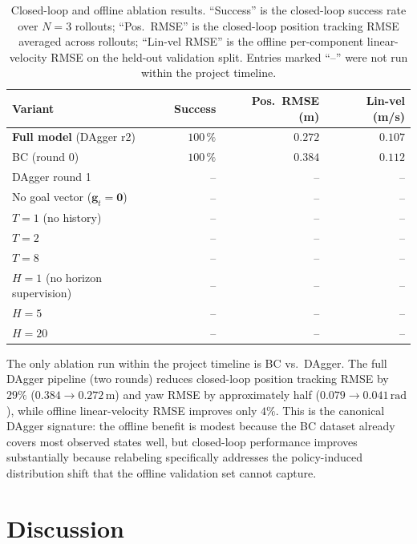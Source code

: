\documentclass[10pt,twocolumn,letterpaper]{article}
\begin{document}
\begin{table}[t]
\centering
\caption{Closed-loop and offline ablation results. ``Success'' is the closed-loop success rate over $N{=}3$ rollouts; ``Pos.\ RMSE'' is the closed-loop position tracking RMSE averaged across rollouts; ``Lin-vel RMSE'' is the offline per-component linear-velocity RMSE on the held-out validation split. Entries marked ``--'' were not run within the project timeline.}
\label{tab:ablation}
\small
\begin{tabular}{@{}lrrr@{}}
\toprule
Variant & Success & Pos.\ RMSE (m) & Lin-vel (m/s) \\
\midrule
\textbf{Full model} (DAgger r2) & $100\,\%$ & $0.272$ & $0.107$ \\
BC (round 0)                    & $100\,\%$ & $0.384$ & $0.112$ \\
DAgger round 1                  & --        & --      & --      \\
\midrule
No goal vector ($\mathbf{g}_t{=}\mathbf{0}$) & -- & -- & -- \\
\midrule
$T{=}1$ (no history)                          & -- & -- & -- \\
$T{=}2$                                       & -- & -- & -- \\
$T{=}8$                                       & -- & -- & -- \\
\midrule
$H{=}1$ (no horizon supervision)              & -- & -- & -- \\
$H{=}5$                                       & -- & -- & -- \\
$H{=}20$                                      & -- & -- & -- \\
\bottomrule
\end{tabular}
\end{table}

The only ablation run within the project timeline is BC vs.\ DAgger. The full DAgger pipeline (two rounds) reduces closed-loop position tracking RMSE by $29\%$ ($0.384 \to 0.272\,\mathrm{m}$) and yaw RMSE by approximately half ($0.079 \to 0.041\,\mathrm{rad}$), while offline linear-velocity RMSE improves only $4\%$. This is the canonical DAgger signature: the offline benefit is modest because the BC dataset already covers most observed states well, but closed-loop performance improves substantially because relabeling specifically addresses the policy-induced distribution shift that the offline validation set cannot capture.

\section{Discussion}
\label{sec:discussion}
\end{document}
